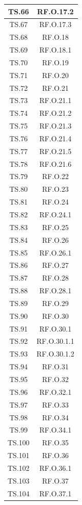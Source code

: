 \documentclass[10pt, a4paper]{article}
\begin{document}
\begin{xltabular}{\textwidth}{|c|c|}
\hline
TS.66 & RF.O.17.2 \\
\hline
TS.67 & RF.O.17.3 \\
\hline
TS.68 & RF.O.18 \\
\hline
TS.69 & RF.O.18.1 \\
\hline
TS.70 & RF.O.19 \\
\hline
TS.71 & RF.O.20 \\
\hline
TS.72 & RF.O.21 \\
\hline
TS.73 & RF.O.21.1 \\
\hline
TS.74 & RF.O.21.2 \\
\hline
TS.75 & RF.O.21.3 \\
\hline
TS.76 & RF.O.21.4 \\
\hline
TS.77 & RF.O.21.5 \\
\hline
TS.78 & RF.O.21.6 \\
\hline
TS.79 & RF.O.22 \\
\hline
TS.80 & RF.O.23 \\
\hline
TS.81 & RF.O.24 \\
\hline
TS.82 & RF.O.24.1 \\
\hline
TS.83 & RF.O.25 \\
\hline
TS.84 & RF.O.26 \\
\hline
TS.85 & RF.O.26.1 \\
\hline
TS.86 & RF.O.27 \\
\hline
TS.87 & RF.O.28 \\
\hline
TS.88 & RF.O.28.1 \\
\hline
TS.89 & RF.O.29 \\
\hline
TS.90 & RF.O.30 \\
\hline
TS.91 & RF.O.30.1 \\
\hline
TS.92 & RF.O.30.1.1 \\
\hline
TS.93 & RF.O.30.1.2 \\
\hline
TS.94 & RF.O.31 \\
\hline
TS.95 & RF.O.32 \\
\hline
TS.96 & RF.O.32.1 \\
\hline
TS.97 & RF.O.33 \\
\hline
TS.98 & RF.O.34 \\
\hline
TS.99 & RF.O.34.1 \\
\hline
TS.100 & RF.O.35 \\
\hline
TS.101 & RF.O.36 \\
\hline
TS.102 & RF.O.36.1 \\
\hline
TS.103 & RF.O.37 \\
\hline
TS.104 & RF.O.37.1 \\

\end{xltabular}
\end{document}
